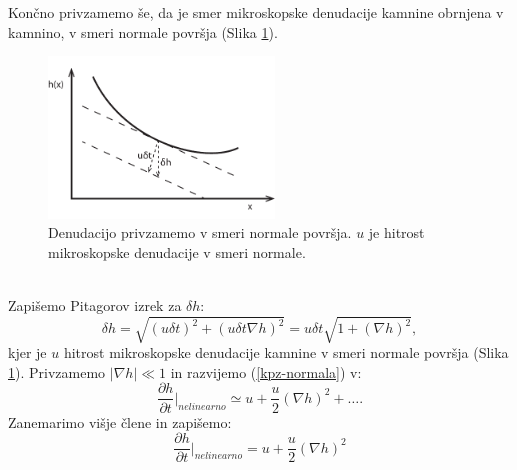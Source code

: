 \documentclass[a4paper, twoside, 12pt]{book}
\begin{document}

Končno privzamemo še, da je smer mikroskopske denudacije kamnine obrnjena v kamnino, v smeri normale površja (Slika \ref{fig:KPZ}). 
\begin{figure}[h!]
  \begin{center}
    \includegraphics[width=6cm]{slike/denudacija}
  \end{center}
  \caption{Denudacijo privzamemo v smeri normale površja. $u$ je hitrost mikroskopske denudacije v smeri normale.}
  \label{fig:KPZ}
\end{figure}
\\ Zapišemo Pitagorov izrek za $\delta h$:
\begin{equation}
  \delta h = \sqrt{(u \delta t)^2 + (u \delta t \nabla h)^2} = u \delta t \sqrt{1 + (\nabla h)^2},
  \label{kpz-normala}
\end{equation}
kjer je $u$ hitrost mikroskopske denudacije kamnine v smeri normale površja (Slika \ref{fig:KPZ}). Privzamemo $|\nabla h| \ll 1$ in razvijemo (\ref{kpz-normala}) v:
\begin{equation}
  \frac{\partial h}{\partial t} \bigg|_{nelinearno} \simeq u + \frac{u}{2} (\nabla h)^2 + \dots.
\end{equation}
Zanemarimo višje člene in zapišemo:
\begin{equation}
  \frac{\partial h}{\partial t} \bigg|_{nelinearno} = u + \frac{u}{2} (\nabla h)^2
\end{equation}
\end{document}
